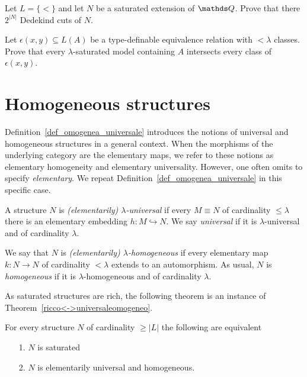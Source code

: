 \begin{exercise}
  Let $L = \{<\}$ and let $N$ be a saturated extension of $\QQ$.
  Prove that there $2^{|N|}$ Dedekind cuts of $N$.
\end{exercise}

\begin{exercise}
  Let $\epsilon(x,y)\subseteq L(A)$ be a type-definable equivalence relation with $<\lambda$ classes.
  Prove that every $\lambda$-saturated model containing $A$ intersects every class of $\epsilon(x,y)$.
\end{exercise}

\section{Homogeneous structures}\label{homogeneous}
Definition~\ref{def_omogenea_universale} introduces the notions of universal and homogeneous structures in a general context.
When the morphisms of the underlying category are the elementary maps, we refer to these notions as elementary homogeneity and elementary universality.
However, one often omits to specify \textit{elementary}. We repeat Definition~\ref{def_omogenea_universale} in this specific case. 

\begin{definition}
A structure $N$ is \emph{(elementarily) $\lambda$-universal\/} if every $M\equiv N$ of cardinality $\le\lambda$ there is an elementary embedding $h:M\hookrightarrow N$.
We say  \emph{universal\/}  if it is $\lambda$-universal and of cardinality $\lambda$.

We say that $N$ is \emph{(elementarily) $\lambda$-homogeneous\/} if every elementary map $k:N\to N$ of cardinality $<\lambda$ extends to an automorphism. 
As usual, $N$ is \emph{homogeneous\/} if it is $\lambda$-homogeneous and of cardinality $\lambda$.
\end{definition}

As saturated structures are rich, the following theorem is an instance of Theorem~\ref{ricco<->universaleomogeneo}.

\begin{theorem}\label{thm_saturo_omogeneouniversale}
For every structure $N$ of cardinality $\ge|L|$ the following are equivalent\nobreak
\begin{itemize}
\item[1.] $N$ is saturated
\item[2.] $N$ is elementarily universal and homogeneous.
\end{itemize}
\end{theorem}

